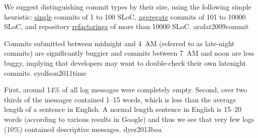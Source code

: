\documentclass{article}
\begin{document}

  {We suggest distinguishing commit types by their size, using the following simple heuristic: \ul{single} commits of 1 to 100 SLoC, \ul{aggregate} commits of 101 to 10000 SLoC, and repository \ul{refactorings} of more than 10000 SLoC.}
  {arafat2009commit}

  {Commits submitted between midnight and 4~AM (referred to as late-night commits) are significantly buggier and commits between 7~AM and noon are less buggy, implying that developers may want to double-check their own latenight commits.}
  {eyolfson2011time}

  {First, around 14\% of all log messages were completely empty. Second, over two thirds of the messages contained 1–15 words, which is less than the average length of a sentence in English. A normal length sentence in English is 15–20 words (according to various results in Google) and thus we see that very few logs (10\%) contained descriptive messages.}
  {dyer2013boa}
\end{document}
